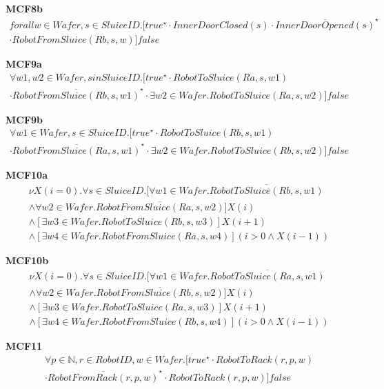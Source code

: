\documentclass[12pt]{report}
\begin{document}
    \textbf{MCF8b}
    \begin{multline*}
        forall w \in \mathit{Wafer}, s \in SluiceID.[true^{\star} \cdot InnerDoorClosed(s) \cdot \overline{InnerDoorOpened(s)}^{\star} \\
        \cdot RobotFromSluice(Rb, s, w)]false
    \end{multline*}

    \textbf{MCF9a}
    \begin{multline*}
        \forall w1,w2 \in \mathit{Wafer}, s in SluiceID.[true^{\star} \cdot RobotToSluice(Ra,s,w1) \\
        \cdot \overline{RobotFromSluice(Rb,s,w1)}^{\star} \cdot  \exists w2 \in \mathit{Wafer}. RobotToSluice(Ra,s,w2)]false
    \end{multline*}

    \textbf{MCF9b}
    \begin{multline*}
        \forall w1 \in \mathit{Wafer}, s \in SluiceID.[true^{\star} \cdot RobotToSluice(Rb,s,w1)\\
        \cdot \overline{RobotFromSluice(Ra,s,w1)}^{\star} \cdot  \exists w2 \in \mathit{Wafer}. RobotToSluice(Rb,s,w2)]false
    \end{multline*}

    \textbf{MCF10a}
    \begin{multline*}
        \nu X(i=0). \forall s \in SluiceID. [\forall w1 \in Wafer. \overline{RobotToSluice(Rb,s,w1)} \\
        \wedge \forall w2 \in Wafer. \overline{RobotFromSluice(Ra,s,w2)}] X(i) \\
        \wedge [\exists w3 \in Wafer. RobotToSluice(Rb,s,w3)]X(i+1) \\
        \wedge [\exists w4 \in Wafer.RobotFromSluice(Ra,s,w4)](i>0 \wedge X(i-1))
    \end{multline*}

    \textbf{MCF10b}
    \begin{multline*}
        \nu X(i=0). \forall s \in SluiceID. [\forall w1 \in Wafer. \overline{RobotToSluice(Ra,s,w1)} \\
        \wedge \forall w2 \in Wafer. \overline{RobotFromSluice(Rb,s,w2)}] X(i) \\
        \wedge [\exists w3 \in Wafer. RobotToSluice(Ra,s,w3)]X(i+1) \\
        \wedge [\exists w4 \in Wafer.RobotFromSluice(Rb,s,w4)](i>0 \wedge X(i-1))
    \end{multline*}

    \textbf{MCF11}
    \begin{multline*}
        \forall p \in \mathbb{N}, r \in RobotID, w \in \mathit{Wafer}. [true^{\star} \cdot RobotToRack(r,p,w)\\
         \cdot \overline{RobotFromRack(r,p,w)}^{\star} \cdot RobotToRack(r,p,w)]false
    \end{multline*}
\end{document}
